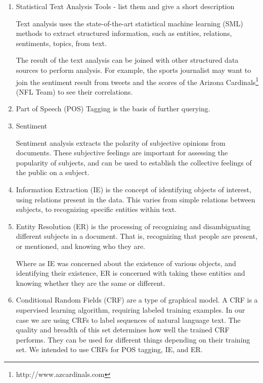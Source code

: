 \documentclass{article}
\begin{document}
\begin{enumerate}
\begin{enumerate}
  \item Statistical Text Analysis Tools - list them and give a short description

    Text analysis uses the state-of-the-art statistical machine learning (SML) methods to extract structured information,
    such as entities, relations, sentiments, topics, from text.

    The result of the text analysis can be joined with other
    structured data sources to perform analysis. For example, the sports
    journalist may want to join the sentiment result from tweets and the
    scores of the Arizona Cardinals\footnote{http://www.azcardinals.com}
    (NFL Team) to see their correlations.


  \item Part of Speech (POS) Tagging is the basis of further querying.


  \item Sentiment

    Sentiment analysis extracts the polarity of subjective opinions from documents.
    These subjective feelings are important for assessing the popularity of subjects,
    and can be used to establish the collective feelings of the public on a subject.

  \item Information Extraction (IE) is the concept of identifying objects of interest,
    using relations present in the data.
    This varies from simple relations between subjects,
    to recognizing specific entities within text.


  \item Entity Resolution (ER) is the processing of recognizing and disambiguating different subjects in a document.
    That is, recognizing that people are present,
    or mentioned, and knowing who they are.

    Where as IE was concerned about the existence of various objects,
    and identifying their existence,
    ER is concerned with taking these entities and knowing whether they are the same or different.


  \item Conditional Random Fields (CRF) are a type of graphical model.
    A CRF is a supervised learning algorithm, requiring labeled training examples.
    In our case we are using CRFs to label sequences of natural language text.
    The quality and breadth of this set determines how well the trained CRF performs.
    They can be used for different things depending on their training set.
    We intended to use CRFs for POS tagging, IE, and ER.


\end{enumerate}
\end{enumerate}
\end{document}
